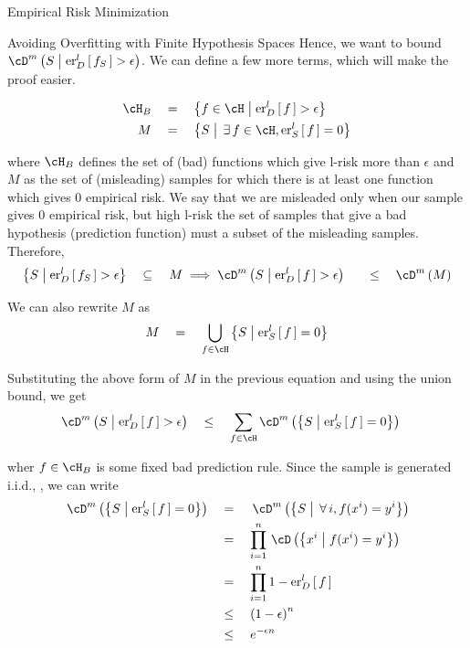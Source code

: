 \documentclass[11pt,a4paper]{article}
\begin{document}
\begin{ssection}{Empirical Risk Minimization}
\begin{ssubsection}{Avoiding Overfitting with Finite Hypothesis Spaces}
		Hence, we want to bound $\cD^m \para{S \pipe \err[_D^l]{f_S} > \epsilon}$. We can define a few more terms, which will make the proof easier.

		\begin{align*}
			\cH_B	&\eq	\set{f \in \cH \pipe \err[_D^l]{f} > \epsilon} \\
			M		&\eq	\set{S \pipe \qexists f \in \cH, \err[_S^l]{f} = 0}
		\end{align*} \sbr

		where $\cH_B$ defines the set of (bad) functions which give l-risk more than $\epsilon$ and $M$ as the set of (misleading) samples for which there is at least one function which gives 0 empirical risk. We say that we are misleaded only when our sample gives 0 empirical risk, but high l-risk  the set of samples that give a bad hypothesis (prediction function) must a subset of the misleading samples. Therefore,
		\begin{align*}
			\set{S \pipe \err[_D^l]{f_S} > \epsilon}				&\qsubseteq	M
			\implies \cD^m\para{S \pipe \err[_D^l]{f} > \epsilon}	&\qle		\cD^m\para{M}
		\end{align*} \sbr

		We can also rewrite $M$ as
		\begin{align*}
			M	\eq	\bigcup_{f \in \cH} \set{S \pipe \err[_S^l]{f} = 0}
		\end{align*} \sbr

		Substituting the above form of $M$ in the previous equation and using the union bound, we get
		\begin{align*}
			\cD^m\para{S \pipe \err[_D^l]{f} > \epsilon}	&\qle		\sum_{f \in \cH} \cD^m\para{\set{S \pipe \err[_S^l]{f} = 0}}
		\end{align*} \sbr

		wher $f \in \cH_B$ is some fixed bad prediction rule. Since the sample is generated i.i.d., , we can write
		\begin{align*}
			\func{\cD^m}{\set{S \pipe \err[_S^l]{f} = 0}}	&\eq	\func{\cD^m}{\set{S \pipe \qforall i, f(x^i) = y^i}} \\
															&\eq	\prod_{i = 1}^n \func{\cD}{\set{x^i \pipe f(x^i) = y^i}} \\
															&\eq	\prod_{i = 1}^n 1 - \err[_D^l]{f} \\
															&\qle	\para{1 - \epsilon}^n \\
															&\qle	\exp{-\epsilon n}
		\end{align*} \sbr


\end{ssubsection}
\end{ssection}
\end{document}
